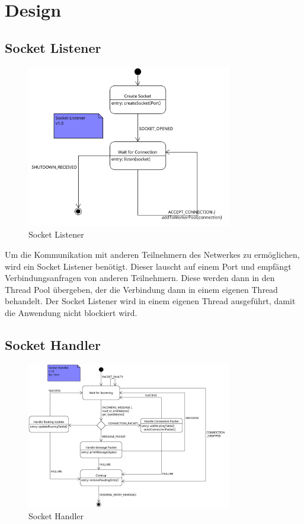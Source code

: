 \section{Design}
\subsection{Socket Listener}

\begin{figure}[H]
\centering
\includegraphics[width=0.8\textwidth]{images/socketlistener.png}
\caption{Socket Listener}
\label{fig:SocketListener}
\end{figure}

Um die Kommunikation mit anderen Teilnehmern des Netwerkes zu ermöglichen, wird ein Socket Listener benötigt. 
Dieser lauscht auf einem Port und empfängt Verbindungsanfragen von anderen Teilnehmern.
Diese werden dann in den Thread Pool übergeben, der die Verbindung dann in einem eigenen Thread behandelt.
Der Socket Listener wird in einem eigenen Thread ausgeführt, damit die Anwendung nicht blockiert wird.

\subsection{Socket Handler}

\begin{figure}[H]
\centering
\includegraphics[width=0.8\textwidth]{images/sockethandler.png}
\caption{Socket Handler}
\label{fig:SocketHandler}
\end{figure}

